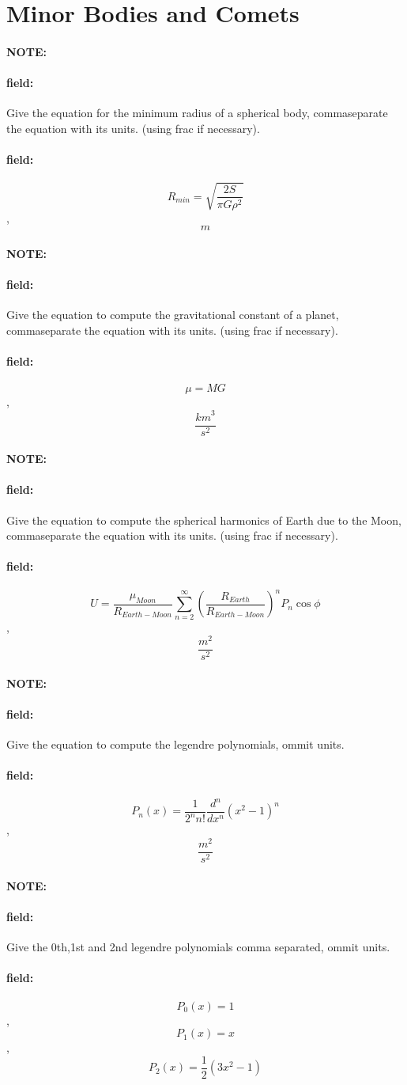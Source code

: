 \documentclass[12pt]{article}
\newenvironment{note}{\paragraph{NOTE:}}{}
\newenvironment{field}{\paragraph{field:}}{}
\begin{document}
\section{Minor Bodies and Comets}
\begin{note}
   \begin{field}
       Give the equation for the minimum radius of a spherical body, commaseparate the equation with its units. (using frac if necessary).
   \end{field}
   \begin{field}
		\[
			R_{min}=\sqrt{\frac{2S}{\pi G \rho^2}}
		\],
		\[
			m
		\]
   \end{field}
\end{note}
\begin{note}
   \begin{field}
       Give the equation to compute the gravitational constant of a planet, commaseparate the equation with its units. (using frac if necessary).
   \end{field}
   \begin{field}
		\[
			\mu=MG
		\],
		\[
			\frac{{km}^3}{s^2}
		\]
   \end{field}
\end{note}
\begin{note}
   \begin{field}
       Give the equation to compute the spherical harmonics of Earth due to the Moon, commaseparate the equation with its units. (using frac if necessary).
   \end{field}
   \begin{field}
		\[
			U=\frac{\mu_{Moon}}{R_{Earth-Moon}}\sum_{n=2}^\infty {\left(\frac{R_{Earth}}{R_{Earth-Moon}}\right)}^n P_n \cos{\phi}
		\],
		\[
			\frac{{m}^2}{s^2}
		\]
   \end{field}
\end{note}
\begin{note}
   \begin{field}
       Give the equation to compute the legendre polynomials, ommit units.
   \end{field}
   \begin{field}
		\[
			P_n(x)=\frac{1}{2^n n!}\frac{d^n}{dx^n}{\left(x^2-1\right)}^n
		\],
		\[
			\frac{{m}^2}{s^2}
		\]
   \end{field}
\end{note}
\begin{note}
   \begin{field}
       Give the 0th,1st and 2nd legendre polynomials comma separated, ommit units.
   \end{field}
   \begin{field}
		\[
			P_0(x)=1
		\],
		\[
			P_1(x)=x
		\],
		\[
			P_2(x)=\frac{1}{2}(3x^2-1)
		\]
   \end{field}
\end{note}
\end{document}

